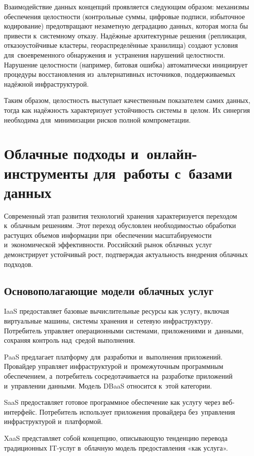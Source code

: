 \documentclass{ou}
\begin{document}
Взаимодействие данных концепций проявляется следующим образом: механизмы обеспечения целостности (контрольные суммы, цифровые подписи, избыточное кодирование) предотвращают незаметную деградацию данных, которая могла бы привести к~системному отказу. Надёжные архитектурные решения (репликация, отказоустойчивые кластеры, геораспределённые хранилища) создают условия для~своевременного обнаружения и~устранения нарушений целостности. Нарушение целостности (например, битовая ошибка) автоматически инициирует процедуры восстановления из~альтернативных источников, поддерживаемых надёжной инфраструктурой.

Таким образом, целостность выступает качественным показателем самих данных, тогда как надёжность характеризует устойчивость системы в~целом. Их синергия необходима для~минимизации рисков полной компрометации.
\newpage
\section{Облачные подходы и~онлайн-инструменты для~работы с~базами данных}
Современный этап развития технологий хранения характеризуется переходом к~облачным решениям. Этот переход обусловлен необходимостью обработки растущих объемов информации при~обеспечении масштабируемости и~экономической эффективности. Российский рынок облачных услуг демонстрирует устойчивый рост, подтверждая актуальность внедрения облачных подходов.
\subsection{Основополагающие модели облачных услуг}
IaaS предоставляет базовые вычислительные ресурсы как услугу, включая виртуальные машины, системы хранения и~сетевую инфраструктуру. Потребитель управляет операционными системами, приложениями и~данными, сохраняя контроль над~средой выполнения.

PaaS предлагает платформу для~разработки и~выполнения приложений. Провайдер управляет инфраструктурой и~промежуточным программным обеспечением, а~потребитель сосредотачивается на~разработке приложений и~управлении данными. Модель DBaaS относится к~этой категории.

SaaS предоставляет готовое программное обеспечение как услугу через веб-интерфейс. Потребитель использует приложения провайдера без~управления инфраструктурой и~платформой.

XaaS представляет собой концепцию, описывающую тенденцию перевода традиционных IT-услуг в~облачную модель предоставления «как услуга».
\end{document}

